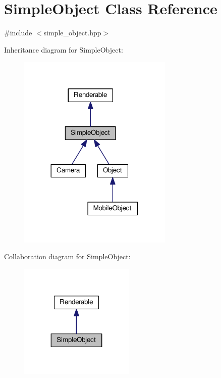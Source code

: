 \hypertarget{class_simple_object}{}\section{Simple\+Object Class Reference}
\label{class_simple_object}


{\ttfamily \#include $<$simple\+\_\+object.\+hpp$>$}



Inheritance diagram for Simple\+Object\+:\nopagebreak
\begin{figure}[H]
\begin{center}
\leavevmode
\includegraphics[width=209pt]{class_simple_object__inherit__graph}
\end{center}
\end{figure}


Collaboration diagram for Simple\+Object\+:\nopagebreak
\begin{figure}[H]
\begin{center}
\leavevmode
\includegraphics[width=155pt]{class_simple_object__coll__graph}
\end{center}
\end{figure}
